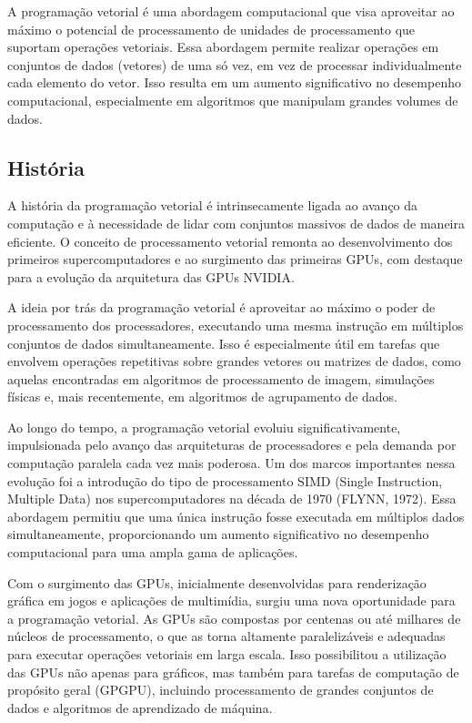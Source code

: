 \documentclass[12pt,
openright, 
oneside, %
a4paper,    %
brazil]{facom-ufu-abntex2}
\begin{document}
A programação vetorial é uma abordagem computacional que visa aproveitar ao máximo o potencial de processamento de unidades de processamento que suportam operações vetoriais. Essa abordagem permite realizar operações em conjuntos de dados (vetores) de uma só vez, em vez de processar individualmente cada elemento do vetor. Isso resulta em um aumento significativo no desempenho computacional, especialmente em algoritmos que manipulam grandes volumes de dados.



\subsection{História}

A história da programação vetorial é intrinsecamente ligada ao avanço da computação e à necessidade de lidar com conjuntos massivos de dados de maneira eficiente. O conceito de processamento vetorial remonta ao desenvolvimento dos primeiros supercomputadores e ao surgimento das primeiras GPUs, com destaque para a evolução da arquitetura das GPUs NVIDIA.

A ideia por trás da programação vetorial é aproveitar ao máximo o poder de processamento dos processadores, executando uma mesma instrução em múltiplos conjuntos de dados simultaneamente. Isso é especialmente útil em tarefas que envolvem operações repetitivas sobre grandes vetores ou matrizes de dados, como aquelas encontradas em algoritmos de processamento de imagem, simulações físicas e, mais recentemente, em algoritmos de agrupamento de dados.

Ao longo do tempo, a programação vetorial evoluiu significativamente, impulsionada pelo avanço das arquiteturas de processadores e pela demanda por computação paralela cada vez mais poderosa. Um dos marcos importantes nessa evolução foi a introdução do tipo de processamento SIMD (Single Instruction, Multiple Data) nos supercomputadores na década de 1970 (FLYNN, 1972). Essa abordagem permitiu que uma única instrução fosse executada em múltiplos dados simultaneamente, proporcionando um aumento significativo no desempenho computacional para uma ampla gama de aplicações.

Com o surgimento das GPUs, inicialmente desenvolvidas para renderização gráfica em jogos e aplicações de multimídia, surgiu uma nova oportunidade para a programação vetorial. As GPUs são compostas por centenas ou até milhares de núcleos de processamento, o que as torna altamente paralelizáveis e adequadas para executar operações vetoriais em larga escala. Isso possibilitou a utilização das GPUs não apenas para gráficos, mas também para tarefas de computação de propósito geral (GPGPU), incluindo processamento de grandes conjuntos de dados e algoritmos de aprendizado de máquina.
\end{document}
